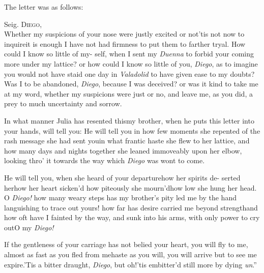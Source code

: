 \documentclass[twoside]{article}
\begin{document}
The letter was as follows:

\indent\quad Seig. \textsc{Diego},\\
\indent\lqq Whether my suspicions of your nose\break
\lqq were justly excited or not\tsk ’tis not now\break
\lqq to inquire\tsk it is enough I have not\break
\lqq had firmness to put them to farther\break
\lqq tryal.\break
\break
\indent\lqq How could I know so little of my-\break
\lqq self, when I sent my \textit{Duenna} to forbid\break
\lqq your coming more under my lattice?\break
\lqq or how could I know so little of you,\break
\lqq \textit{Diego}, as to imagine you would not\break
\lqq have staid one day in \textit{Valadolid} to have\break
\lqq given ease to my doubts?\tsk Was I to\break
\lqq be abandoned, \textit{Diego}, because I was\break
\lqq deceived? or was it kind to take me\break
\lqq at my word, whether my suspicions\break
\lqq were just or no, and leave me, as you\break
\lqq did, a prey to much uncertainty and\break
\lqq sorrow.

\indent\lqq In what manner Julia has resented\break
\lqq this\tsk my brother, when he puts this\break
\lqq letter into your hands, will tell you:\break
\lqq He will tell you in how few moments\break
\lqq she repented of the rash message she\break
\lqq had sent you\tsk in what frantic haste\break
\lqq she flew to her lattice, and how many\break
\lqq days and nights together she leaned\break
\lqq immoveably upon her elbow, looking\break
\lqq thro’ it towards the way which \textit{Diego}\break
\lqq was wont to come.\hfill

\indent\lqq He will tell you, when she heard\break
\lqq of your departure\tsk how her spirits de-\break
\lqq serted her\tsk how her heart sicken’d\tsk\break
\lqq how piteously she mourn’d\tsh how low\break
\lqq she hung her head. O \textit{Diego!} how\break
\lqq many weary steps has my brother’s\break
\lqq pity led me by the hand languishing\break
\lqq to trace out yours! how far has desire\break
\lqq carried me beyond strength\tsh and how
\lqq oft have I fainted by the way, and\break
\lqq sunk into his arms, with only power\break
\lqq to cry out\tsk O my \textit{Diego!}

\indent\lqq If the gentleness of your carriage\break
\lqq has not belied your heart, you will fly\break
\lqq to me, almost as fast as you fled from\break
\lqq me\tsk haste as you will, you will arrive\break
\lqq but to see me expire.\tsk ’Tis a bitter\break
\lqq draught, \textit{Diego}, but oh!\@ ’tis embitter’d\break
\lqq still more by dying \textit{un}\tsh.”
\end{document}
